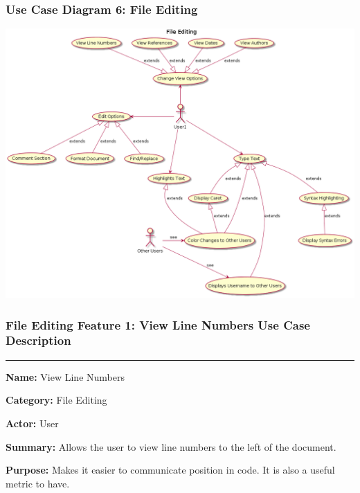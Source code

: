 \documentclass[twoside,letterpaper]{article}
\begin{document}
\subsubsection[Use Case Diagram 6: File Editing]{\rmfamily\bfseries\color{black}
	Use Case Diagram 6: File Editing}

\includegraphics[width=\textwidth]{images/UseCaseDiagrams/FileEditing}

\newpage

\subsubsection[File Editing Feature 1: View Line Numbers]{\rmfamily\bfseries\color{black}
	File Editing Feature 1: View Line Numbers Use Case Description}
\hypertarget{RefHeading22059017292}{}

\vspace{2pt}
\hrule
\vspace{8pt}
	\noindent\textbf{Name:} View Line Numbers \newline
	
	\noindent\textbf{Category:} File Editing \newline
	
	\noindent\textbf{Actor:} User \newline
	
	\noindent\textbf{Summary:} Allows the user to view line numbers to the left of the document. \newline
	
	\noindent\textbf{Purpose:} Makes it easier to communicate position in code. It is also a useful metric to have.\newline
	
\end{document}
